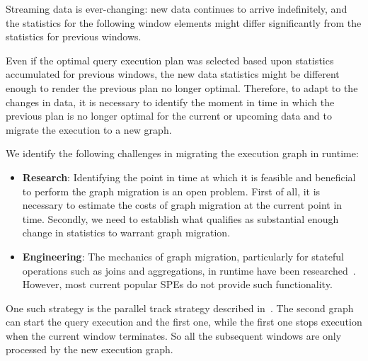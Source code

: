 Streaming data is ever-changing: new data continues to arrive indefinitely, and the statistics for the following window elements might differ significantly from the statistics for previous windows. 

Even if the optimal query execution plan was selected based upon statistics accumulated for previous windows, the new data statistics might be different enough to render the previous plan no longer optimal. Therefore, to adapt to the changes in data, it is necessary to identify the moment in time in which the previous plan is no longer optimal for the current or upcoming data and to migrate the execution to a new graph. 

We identify the following challenges in migrating the execution graph in runtime:
\begin{itemize}
 \item \textbf{Research}: Identifying the point in time at which it is feasible and beneficial to perform the graph migration is an open problem. First of all, it is necessary to estimate the costs of graph migration at the current point in time. Secondly, we need to establish what qualifies as substantial enough change in statistics to warrant graph migration. 

 \item \textbf{Engineering}: 
    The mechanics of graph migration, particularly for stateful operations such as joins and aggregations, in runtime have been researched~\cite{zhu2004dynamic}.
 However, most current popular SPEs do not provide such functionality. 
   \end{itemize}
One such strategy is the parallel track strategy described in~\cite{zhu2004dynamic}. 
The second graph can start the query execution and the first one, while the first one stops execution when the current window terminates. So all the subsequent windows are only processed by the new execution graph.

